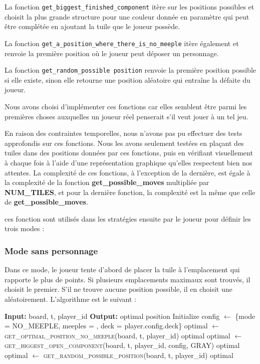 La fonction \texttt{get\_biggest\_finished\_component} itère sur les positions possibles et choisit la plus grande structure pour une couleur donnée en paramètre qui peut être complétée en ajoutant la tuile que le joueur possède.

La fonction \texttt{get\_a\_position\_where\_there\_is\_no\_meeple} itère également et renvoie la première position où le joueur peut déposer un personnage.

La fonction \texttt{get\_random\_possible
position} renvoie la première position possible si elle existe, sinon elle retourne une position aléatoire qui entraîne la défaite du joueur.

Nous avons choisi d'implémenter ces fonctions car elles semblent être parmi les premières choses auxquelles un joueur réel penserait s'il veut jouer à un tel jeu.

En raison des contraintes temporelles, nous n'avons pas pu effectuer des tests approfondis sur ces fonctions. Nous les avons seulement testées en plaçant des tuiles dans des positions données par ces fonctions, puis en vérifiant visuellement à chaque fois à l'aide d'une représentation graphique qu'elles respectent bien nos attentes.
La complexité de ces fonctions, à l'exception de la dernière, est égale à la complexité de la fonction \textbf{get\_possible\_moves} multipliée par \textbf{NUM\_TILES}, et pour la dernière fonction, la complexité est la même que celle de \textbf{get\_possible\_moves}.

ces fonction sont utilisés dans les stratégies ensuite par le joueur pour définir les trois modes :

\subsubsection{Mode sans personnage}
Dans ce mode, le joueur tente d'abord de placer la tuile à l'emplacement qui rapporte le plus de points. Si plusieurs emplacements maximaux sont trouvés, il choisit le premier. S'il ne trouve aucune position possible, il en choisit une aléatoirement. L'algorithme est le suivant :
\begin{algorithm}[H]
\caption{play\_in\_no\_meeple}
\begin{algorithmic}[1]
\STATE \textbf{Input:} board, t, player\_id
\STATE \textbf{Output:} optimal position
\STATE Initialize config $\gets$ \{mode = NO\_MEEPLE, meeples = , deck = player.config.deck\}
\STATE optimal $\gets$ \textsc{get\_optimal\_position\_no\_meeple}(board, t, player\_id)
    \RETURN optimal
\ENDIF
\STATE optimal $\gets$ \textsc{get\_biggest\_open\_component}(board, t, player\_id, config, GRAY)
    \RETURN optimal
\ENDIF
\STATE optimal $\gets$ \textsc{get\_random\_possible\_position}(board, t, player\_id)
\RETURN optimal
\end{algorithmic}
\end{algorithm}

